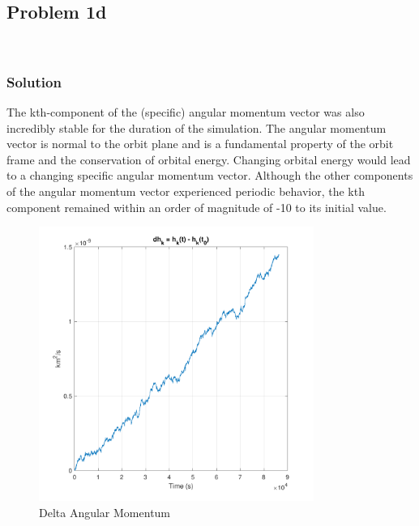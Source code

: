 \documentclass[conf]{new-aiaa}
\begin{document}
\subsection*{Problem 1d} 

\begin{center}
	 \\
\end{center}


\subsubsection*{Solution} 

The kth-component of the (specific) angular momentum vector was also incredibly stable for the duration of the simulation. The angular momentum vector is normal to the orbit plane and is a fundamental property of the orbit frame and the conservation of orbital energy. Changing orbital energy would lead to a changing specific angular momentum vector. Although the other components of the angular momentum vector experienced periodic behavior, the kth component remained within an order of magnitude of -10 to its initial value. 

\begin{figure}[H]
	\centering 
	\includegraphics[width=0.8\textwidth]{Problem 1d - Delta Angular Momentum.pdf}
	\caption{Delta Angular Momentum} 
	\label{fig:prob_1d}
\end{figure}
\end{document}
